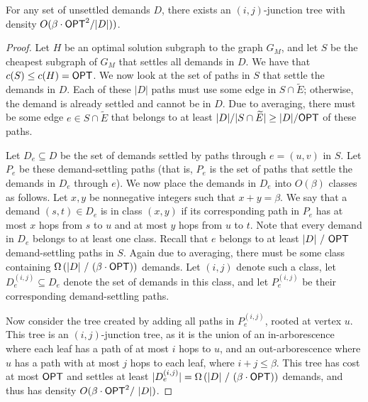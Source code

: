 \begin{lemma}
\label{lem:existence}
    For any set of unsettled demands $D$, there exists an $(i,j)$-junction tree with density $O(\beta \cdot {{{\sf OPT}}}^2 / |D|) )$.
\end{lemma}
\begin{proof}
    Let $H$ be an optimal solution subgraph to the graph $G_M$, and let $S$ be the cheapest subgraph of $G_M$ that settles all demands in $D$.
    We have that $c(S) \leq c(H) = {{\sf OPT}}$.
    We now look at the set of paths in $S$ that settle the demands in $D$. Each of these $|D|$ paths must use some edge in $S \cap \widetilde{E}$; otherwise, the demand is already settled and cannot be in $D$. Due to averaging, there must be some edge $e \in S \cap \widetilde{E}$ that belongs to at least $|D| / |S \cap \widetilde{E}| \geq |D| / {{\sf OPT}}$ of these paths. 
    
    Let $D_e \subseteq D$ be the set of demands settled by paths through $e = (u,v)$ in $S$. Let $P_{e}$ be these demand-settling paths (that is, $P_{e}$ is the set of paths that settle the demands in $D_e$ through $e$). 
    We now place the demands in $D_e$ into $O(\beta)$ classes as follows. Let $x,y$ be nonnegative integers such that $x+y = \beta$. We say that a demand $(s,t) \in D_e$ is in class $(x,y)$ if its corresponding path in $P_{e}$ has at most $x$ hops from $s$ to $u$ and at most $y$ hops from $u$ to $t$. Note that every demand in $D_e$ belongs to at least one class. Recall that $e$ belongs to at least $|D| \mbox{ } / \mbox{ } {{\sf OPT}}$ demand-settling paths in $S$.
    Again due to averaging, there must be some class containing $\Omega\left( |D| \mbox{ } / \mbox{ } (\beta \cdot {{\sf OPT}}) \right)$ demands. Let $(i,j)$ denote such a class, let $D_e^{(i,j)} \subseteq D_e$ denote the set of demands in this class, and let $P_e^{(i,j)}$ be their corresponding demand-settling paths. 

    Now consider the tree created by adding all paths in $P_{e}^{(i,j)}$, rooted at vertex $u$. This tree is an $(i, j)$-junction tree, as it is the union of an in-arborescence where each leaf has a path of at most $i$ hops to $u$, and an out-arborescence where $u$ has a path with at most $j$ hops to each leaf, where $i+j \leq \beta$. This tree has cost at most ${{\sf OPT}}$ and settles at least $|D_e^{(i,j)}| = \Omega \left( |D| \mbox{ } / \mbox{ } (\beta \cdot {{\sf OPT}}) \right)$ demands, and thus has density $O( \beta \cdot {{{\sf OPT}}}^2 / \mbox{ } |D| )$.
\end{proof}

